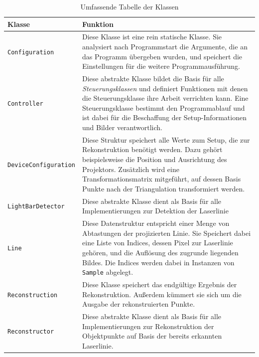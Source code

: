 \documentclass[ngerman,a4paper,parskip=half]{scrartcl}
\begin{document}
\begin{table}[p]
	\begin{tabular}{lp{10cm}}
		\bfseries Klasse             & \bfseries Funktion\\
		\hline\hline
		\texttt{Configuration}       &
			Diese Klasse ist eine rein statische Klasse. Sie analysiert nach Programmstart die Argumente, die an das Programm übergeben wurden, und speichert die Einstellungen für die weitere Programmausführung.\\
		\hline
		\texttt{Controller}          &
			Diese abstrakte Klasse bildet die Basis für alle \emph{Steuerungsklassen} und definiert Funktionen mit denen die Steuerungsklasse ihre Arbeit verrichten kann. Eine Steuerungsklasse bestimmt den Programmablauf und ist dabei für die Beschaffung der Setup-Informationen und Bilder verantwortlich.\\
		\hline
		\texttt{DeviceConfiguration} &
			Diese Struktur speichert alle Werte zum Setup, die zur Rekonstruktion benötigt werden. Dazu gehört beispielsweise die Position und Ausrichtung des Projektors. Zusätzlich wird eine Transformationsmatrix mitgeführt, auf dessen Basis Punkte nach der Triangulation transformiert werden.\\
		\hline
		\texttt{LightBarDetector}    &
			Diese abstrakte Klasse dient als Basis für alle Implementierungen zur Detektion der Laserlinie\\
		\hline
		\texttt{Line}                &
			Diese Datenstruktur entspricht einer Menge von Abtastungen der projizierten Linie. Sie Speichert dabei eine Liste von Indices, dessen Pixel zur Laserlinie gehören, und die Auflösung des zugrunde liegenden Bildes. Die Indices werden dabei in Instanzen von \texttt{Sample} abgelegt.\\
		\hline
		\texttt{Reconstruction}      &
			Diese Klasse speichert das endgültige Ergebnis der Rekonstruktion. Außerdem kümmert sie sich um die Ausgabe der rekonstruierten Punkte.\\
		\hline
		\texttt{Reconstructor}       &
			Diese abstrakte Klasse dient als Basis für alle Implementierungen zur Rekonstruktion der Objektpunkte auf Basis der bereits erkannten Laserlinie.\\
		\hline\hline
	\end{tabular}
	\caption{Umfassende Tabelle der Klassen}
	\label{tab:classes_all}
\end{table}

\end{document}
